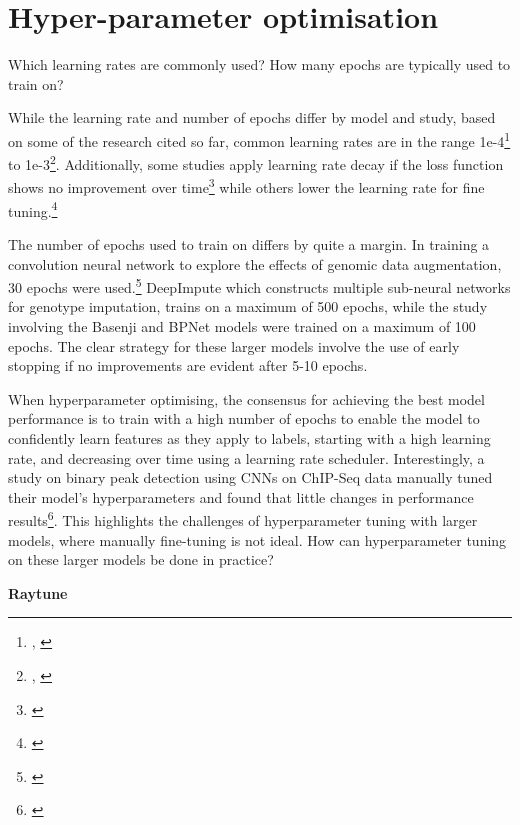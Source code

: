 \documentclass[
]{book}
\begin{document}
\section{Hyper-parameter optimisation}\label{hyper-parameter-optimisation}

Which learning rates are commonly used? How many epochs are typically used to train on?

While the learning rate and number of epochs differ by model and study, based on some of the research cited so far, common learning rates are in the range 1e-4\footnote{\citep{cedric2019}, \citep{avsec2021}} to 1e-3\footnote{\citep{cao2019}, \citep{toneyan2022}}. Additionally, some studies apply learning rate decay if the loss function shows no improvement over time\footnote{\citet{toneyan2022}} while others lower the learning rate for fine tuning.\footnote{\citet{avsec2021}}

The number of epochs used to train on differs by quite a margin. In training a convolution neural network to explore the effects of genomic data augmentation, 30 epochs were used.\footnote{\citet{cao2019}} DeepImpute which constructs multiple sub-neural networks for genotype imputation, trains on a maximum of 500 epochs, while the study involving the Basenji and BPNet models were trained on a maximum of 100 epochs. The clear strategy for these larger models involve the use of early stopping if no improvements are evident after 5-10 epochs.

When hyperparameter optimising, the consensus for achieving the best model performance is to train with a high number of epochs to enable the model to confidently learn features as they apply to labels, starting with a high learning rate, and decreasing over time using a learning rate scheduler. Interestingly, a study on binary peak detection using CNNs on ChIP-Seq data manually tuned their model's hyperparameters and found that little changes in performance results\footnote{\citet{oh2020}}. This highlights the challenges of hyperparameter tuning with larger models, where manually fine-tuning is not ideal. How can hyperparameter tuning on these larger models be done in practice?

\textbf{Raytune}
\end{document}
